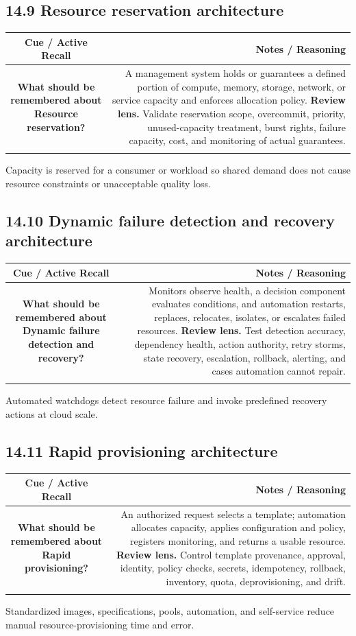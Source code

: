 \documentclass[11pt]{article}
\newcommand{\CornellHeader}{\rowcolor{Navy}\color{white}\bfseries Cue / Active Recall & \color{white}\bfseries Notes / Reasoning \\\endhead}
\newcommand{\CornellRow}[2]{\cellcolor{CueGray}\textbf{#1} & #2 \\\addlinespace[3pt]}
\begin{document}
\subsection{14.9 Resource reservation architecture}
\begin{longtable}{@{}C N@{}}
\CornellHeader
\CornellRow{What should be remembered about Resource reservation?}{A management system holds or guarantees a defined portion of compute, memory, storage, network, or service capacity and enforces allocation policy. \textbf{Review lens.} Validate reservation scope, overcommit, priority, unused-capacity treatment, burst rights, failure capacity, cost, and monitoring of actual guarantees.}
\end{longtable}
\begin{sectionsummarybox}
Capacity is reserved for a consumer or workload so shared demand does not cause resource constraints or unacceptable quality loss.
\end{sectionsummarybox}
\subsection{14.10 Dynamic failure detection and recovery architecture}
\begin{longtable}{@{}C N@{}}
\CornellHeader
\CornellRow{What should be remembered about Dynamic failure detection and recovery?}{Monitors observe health, a decision component evaluates conditions, and automation restarts, replaces, relocates, isolates, or escalates failed resources. \textbf{Review lens.} Test detection accuracy, dependency health, action authority, retry storms, state recovery, escalation, rollback, alerting, and cases automation cannot repair.}
\end{longtable}
\begin{sectionsummarybox}
Automated watchdogs detect resource failure and invoke predefined recovery actions at cloud scale.
\end{sectionsummarybox}
\subsection{14.11 Rapid provisioning architecture}
\begin{longtable}{@{}C N@{}}
\CornellHeader
\CornellRow{What should be remembered about Rapid provisioning?}{An authorized request selects a template; automation allocates capacity, applies configuration and policy, registers monitoring, and returns a usable resource. \textbf{Review lens.} Control template provenance, approval, identity, policy checks, secrets, idempotency, rollback, inventory, quota, deprovisioning, and drift.}
\end{longtable}
\begin{sectionsummarybox}
Standardized images, specifications, pools, automation, and self-service reduce manual resource-provisioning time and error.
\end{sectionsummarybox}
\end{document}
